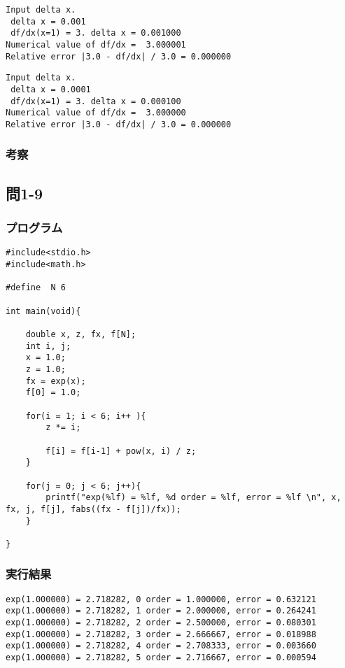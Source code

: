 \documentclass{jarticle}
\begin{document}
\begin{breakbox}
\begin{verbatim}
Input delta x. 
 delta x = 0.001
 df/dx(x=1) = 3. delta x = 0.001000 
Numerical value of df/dx =  3.000001 
Relative error |3.0 - df/dx| / 3.0 = 0.000000 
\end{verbatim}
\end{breakbox}

\begin{breakbox}
\begin{verbatim}
Input delta x. 
 delta x = 0.0001
 df/dx(x=1) = 3. delta x = 0.000100 
Numerical value of df/dx =  3.000000 
Relative error |3.0 - df/dx| / 3.0 = 0.000000 
\end{verbatim}
\end{breakbox}
\subsubsection{考察\\}

\subsection{問1-9\\}
\subsubsection{プログラム\\}
\begin{breakbox}
\begin{verbatim}
#include<stdio.h>
#include<math.h>

#define  N 6

int main(void){

    double x, z, fx, f[N];
    int i, j;
    x = 1.0;
    z = 1.0;
    fx = exp(x);
    f[0] = 1.0;

    for(i = 1; i < 6; i++ ){
        z *= i;

        f[i] = f[i-1] + pow(x, i) / z;
    }

    for(j = 0; j < 6; j++){
        printf("exp(%lf) = %lf, %d order = %lf, error = %lf \n", x, fx, j, f[j], fabs((fx - f[j])/fx));
    }

}
\end{verbatim}
\end{breakbox}

\subsubsection{実行結果\\}
\begin{breakbox}
\begin{verbatim}
exp(1.000000) = 2.718282, 0 order = 1.000000, error = 0.632121 
exp(1.000000) = 2.718282, 1 order = 2.000000, error = 0.264241 
exp(1.000000) = 2.718282, 2 order = 2.500000, error = 0.080301 
exp(1.000000) = 2.718282, 3 order = 2.666667, error = 0.018988 
exp(1.000000) = 2.718282, 4 order = 2.708333, error = 0.003660 
exp(1.000000) = 2.718282, 5 order = 2.716667, error = 0.000594 
\end{verbatim}
\end{breakbox}
\end{document}
